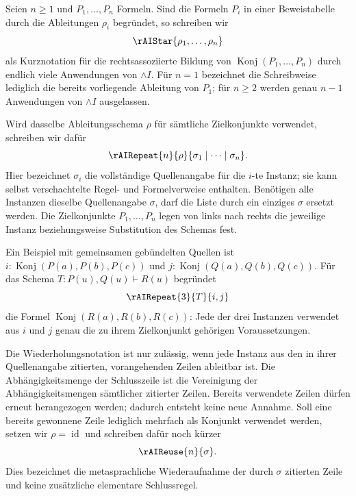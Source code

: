 \documentclass[main.tex]{subfiles}
\begin{document}
\begin{definition}
\label{rule:AIStar}
Seien \(n\geq1\) und \(P_1,\ldots,P_n\) Formeln. Sind die Formeln
\(P_i\) in einer Beweistabelle durch die Ableitungen
\(\rho_i\) begründet, so schreiben wir
\[
  \rAIStar{\rho_1,\ldots,\rho_n}
\]
als Kurznotation für die rechtsassoziierte Bildung von
\(\operatorname{Konj}(P_1,\ldots,P_n)\) durch endlich viele Anwendungen
von \(\land I\). Für \(n=1\) bezeichnet die Schreibweise lediglich die
bereits vorliegende Ableitung von \(P_1\); für \(n\geq2\) werden genau
\(n-1\) Anwendungen von \(\land I\) ausgelassen.

Wird dasselbe Ableitungsschema \(\rho\) für sämtliche Zielkonjunkte
verwendet, schreiben wir dafür
\[
  \rAIRepeat{n}{\rho}{\sigma_1\mid\cdots\mid\sigma_n}.
\]
Hier bezeichnet \(\sigma_i\) die vollständige Quellenangabe für die
\(i\)-te Instanz; sie kann selbst verschachtelte Regel- und
Formelverweise enthalten. Benötigen alle Instanzen dieselbe
Quellenangabe \(\sigma\), darf die Liste durch ein einziges
\(\sigma\) ersetzt werden. Die Zielkonjunkte \(P_1,\ldots,P_n\) legen
von links nach rechts die jeweilige Instanz beziehungsweise Substitution
des Schemas fest.

Ein Beispiel mit gemeinsamen gebündelten Quellen ist
\(i\colon\operatorname{Konj}(P(a),P(b),P(c))\) und
\(j\colon\operatorname{Konj}(Q(a),Q(b),Q(c))\). Für das Schema
\(T\colon P(u),Q(u)\vdash R(u)\) begründet
\[
  \rAIRepeat{3}{T}{i,j}
\]
die Formel \(\operatorname{Konj}(R(a),R(b),R(c))\): Jede der drei
Instanzen verwendet aus \(i\) und \(j\) genau die zu ihrem Zielkonjunkt
gehörigen Voraussetzungen.

Die Wiederholungsnotation ist nur zulässig, wenn jede Instanz aus den
in ihrer Quellenangabe zitierten, vorangehenden Zeilen ableitbar ist.
Die Abhängigkeitsmenge der Schlusszeile ist die Vereinigung der
Abhängigkeitsmengen sämtlicher zitierter Zeilen. Bereits verwendete
Zeilen dürfen erneut herangezogen werden; dadurch entsteht keine neue
Annahme. Soll eine bereits gewonnene Zeile lediglich mehrfach als
Konjunkt verwendet werden, setzen wir \(\rho=\operatorname{id}\) und
schreiben dafür noch kürzer
\[
  \rAIReuse{n}{\sigma}.
\]
Dies bezeichnet die metasprachliche Wiederaufnahme der durch
\(\sigma\) zitierten Zeile und keine zusätzliche elementare
Schlussregel.
\end{definition}
\end{document}
